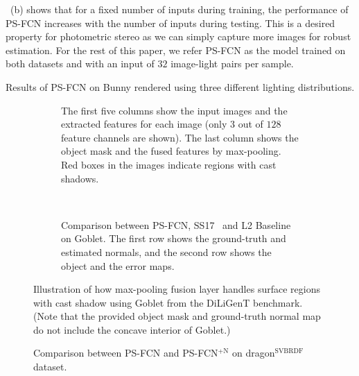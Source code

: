\documentclass[10pt,journal,compsoc]{IEEEtran}
\newcommand{\rev}[1]{#1}
\begin{document}
~(b) shows that for a fixed number of inputs during training, the performance of PS-FCN increases with the number of inputs during testing. This is a desired property for photometric stereo as we can simply capture more images for robust estimation. 
For the rest of this paper, we refer PS-FCN as the model trained on both datasets and with an input of $32$ image-light pairs per sample.

\begin{table}[t] \centering
    \caption{\rev{Results of PS-FCN on {\sc Bunny} rendered using three different lighting distributions.}} \label{tab:res_synth_mirco_baseline}
    
\end{table}

\begin{figure}[t] \centering
    \begin{subfigure}[t]{0.49\textwidth}
        \vspace{-1.5em}
        \caption{The first five columns show the input images and the extracted features for each image (only $3$ out of $128$ feature channels are shown). The last column shows the object mask and the fused features by max-pooling. Red boxes in the images indicate regions with cast shadows.} \label{fig:visual_cast_shadow}
    \end{subfigure} \\ \vspace{1em}
    \begin{subfigure}[t]{0.49\textwidth}
        
        \caption{Comparison between PS-FCN, SS17~\cite{santo2017deep} and L2 Baseline~\cite{woodham1980ps} on {\sc Goblet}. The first row shows the ground-truth and estimated normals, and the second row shows the object and the error maps.} \label{fig:compare_cast_shadow} %
    \end{subfigure}
    \caption{Illustration of how max-pooling fusion layer handles surface regions with cast shadow using {\sc Goblet} from the DiLiGenT benchmark. (Note that the provided object mask and ground-truth normal map do not include the concave interior of {\sc Goblet}.)} \label{fig:cast_shadow}
\end{figure}

\begin{figure}[t] \centering
    
    \caption{Comparison between PS-FCN and PS-FCN$^\text{+N}$ on {\sc dragon}$^{\text{SVBRDF}}$ dataset.} \label{fig:res_synth_SVBRDF} %
\end{figure}
\end{document}

